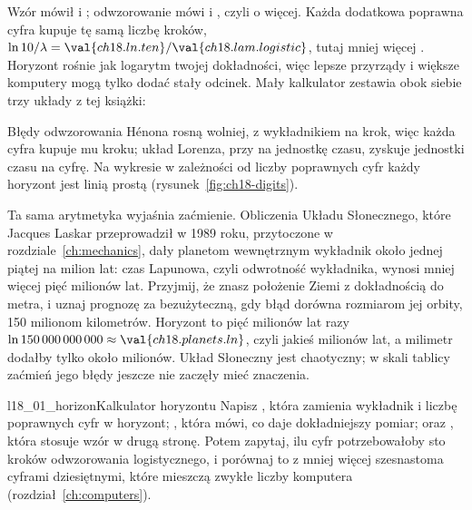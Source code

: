 \noindent
Wzór mówił  i ; odwzorowanie mówi
 i , czyli o
 więcej. Każda dodatkowa poprawna
cyfra kupuje tę samą liczbę kroków, $\ln 10 / \lambda = \val{ch18.ln.ten} /
\val{ch18.lam.logistic}$, tutaj mniej więcej . Horyzont
rośnie jak logarytm twojej dokładności, więc lepsze przyrządy i większe
komputery mogą tylko dodać stały odcinek. Mały kalkulator zestawia obok
siebie trzy układy z tej książki:



\noindent
Błędy odwzorowania Hénona rosną wolniej, z wykładnikiem 
na krok, więc każda cyfra kupuje mu
 kroku; układ Lorenza, przy
 na jednostkę czasu, zyskuje 
jednostki czasu na cyfrę. Na wykresie w zależności od liczby poprawnych
cyfr każdy horyzont jest linią prostą (rysunek~\ref{fig:ch18-digits}).

Ta sama arytmetyka wyjaśnia zaćmienie. Obliczenia Układu Słonecznego, które
Jacques Laskar przeprowadził w 1989 roku, przytoczone w
rozdziale~\ref{ch:mechanics}, dały planetom wewnętrznym wykładnik około
jednej piątej na milion lat: czas Lapunowa, czyli odwrotność wykładnika,
wynosi mniej więcej pięć milionów lat. Przyjmij, że znasz położenie Ziemi z
dokładnością do metra, i uznaj prognozę za bezużyteczną, gdy błąd dorówna rozmiarom jej
orbity, 150 milionom kilometrów. Horyzont to pięć milionów lat razy
$\ln 150\,000\,000\,000 \approx \val{ch18.planets.ln}$, czyli jakieś
 milionów lat, a milimetr dodałby tylko około
 milionów. Układ Słoneczny jest chaotyczny; w skali
tablicy zaćmień jego błędy jeszcze nie zaczęły mieć znaczenia.

\begin{lab}{l18_01_horizon}{Kalkulator horyzontu}
Napisz , która zamienia wykładnik i liczbę poprawnych
cyfr w horyzont; , która mówi, co daje dokładniejszy
pomiar; oraz , która stosuje wzór w drugą stronę.
Potem zapytaj, ilu cyfr potrzebowałoby sto kroków odwzorowania
logistycznego, i porównaj to z mniej więcej szesnastoma cyframi dziesiętnymi,
które mieszczą zwykłe liczby komputera (rozdział~\ref{ch:computers}).
\end{lab}

